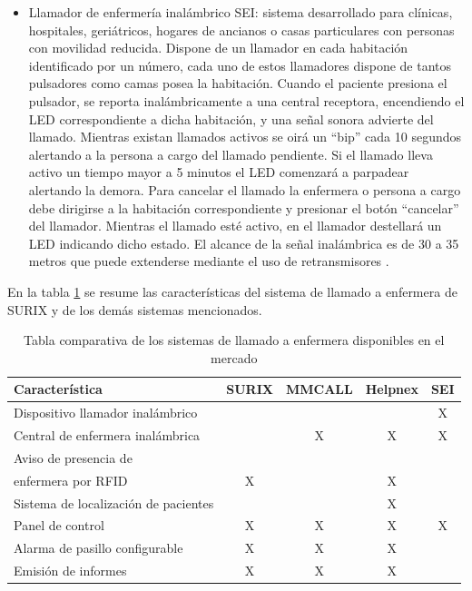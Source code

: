 \begin{itemize}
\item Llamador de enfermería inalámbrico SEI: sistema desarrollado para clínicas, hospitales, geriátricos, hogares de ancianos o casas particulares con personas con movilidad reducida. Dispone de un llamador en cada habitación identificado por un número, cada uno de estos llamadores dispone de tantos pulsadores como camas posea la habitación. Cuando el paciente presiona el pulsador, se reporta inalámbricamente a una central receptora, encendiendo el LED correspondiente a dicha habitación, y una señal sonora advierte del llamado. Mientras existan llamados activos se oirá un “bip” cada 10 segundos alertando a la persona a cargo del llamado pendiente. Si el llamado lleva activo un tiempo mayor a 5 minutos el LED comenzará a parpadear alertando la demora. Para cancelar el llamado la enfermera o persona a cargo debe dirigirse a la habitación correspondiente y presionar el botón “cancelar” del llamador. Mientras el llamado esté activo, en el llamador destellará un LED indicando dicho estado. El alcance de la señal inalámbrica es de 30 a 35 metros que puede extenderse mediante el uso de retransmisores \cite{sei}.

\end{itemize}

En la tabla \ref{tab:sistemasDeLLamadoEnfermera} se resume las características del sistema de llamado a enfermera de SURIX y de los demás sistemas mencionados.

\begin{table}[h]
	\centering
	\caption[Sistemas de llamado a enfermera]{Tabla comparativa de los sistemas de llamado a enfermera disponibles en el mercado}
	\begin{tabular}{l c c c c}    
		\toprule
		\textbf{Característica} 	 & \textbf{SURIX} & \textbf{MMCALL} & \textbf{Helpnex} & \textbf{SEI}\\
		\midrule
		Dispositivo llamador inalámbrico 				&  	&  	&  	& X \\
		Central de enfermera inalámbrica 				&  	& X & X & X \\
		Aviso de presencia de\\enfermera por RFID 		& X	&  	& X	&   \\
		Sistema de localización de pacientes 			&  	&  	& X	&   \\
		Panel de control 								& X	& X	& X	& X \\
		Alarma de pasillo configurable	 				& X	& X	& X	&   \\
		Emisión de informes				 				& X	& X	& X	&   \\
		\bottomrule
		\hline
	\end{tabular}
	\label{tab:sistemasDeLLamadoEnfermera}
\end{table}

